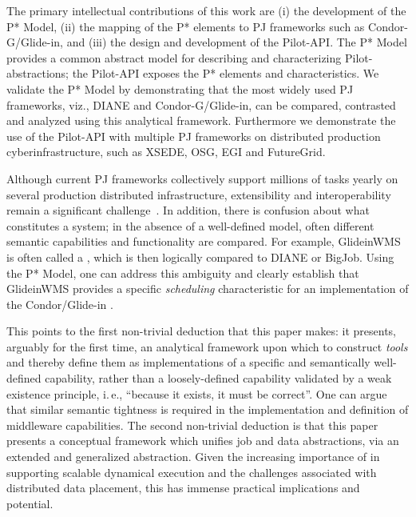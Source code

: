 \documentclass[conference]{IEEEtran}
\begin{document}

The primary intellectual contributions of this work are (i) the
development of the P* Model, (ii) the mapping of the P* elements to PJ
frameworks such as Condor-G/Glide-in, and (iii) the design and
development of the Pilot-API.  The P* Model provides a common abstract
model for describing and characterizing Pilot-abstractions; the
Pilot-API exposes the P* elements and characteristics.  We validate
the P* Model by demonstrating that the most widely used PJ frameworks,
viz., DIANE and Condor-G/Glide-in, can be compared, contrasted and
analyzed using this analytical framework.  Furthermore we demonstrate
the use of the Pilot-API with multiple PJ frameworks on distributed
production cyberinfrastructure, such as XSEDE, OSG, EGI and
FutureGrid.

Although current PJ frameworks collectively support millions of tasks
yearly on several production distributed infrastructure, extensibility
and interoperability remain a significant challenge~\cite{extenci}. In
addition, there is confusion about what constitutes a \pilotjob
system; in the absence of a well-defined model, often different
semantic capabilities and functionality are compared. For example, 
GlideinWMS is often called a \pilotjob, which is then logically
compared to DIANE or BigJob. Using the P* Model, one can address this
ambiguity and clearly establish that GlideinWMS provides a specific
{\it scheduling} characteristic for an implementation of the
Condor/Glide-in \pilotjob. 

This points to the first non-trivial deduction that this paper makes:
it presents, arguably for the first time, an analytical framework upon
which to construct {\it tools} and thereby define them as
implementations of a specific and semantically well-defined
capability, rather than a loosely-defined capability validated by a
weak existence principle, i.\,e., ``because it exists, it must be
correct''. One can argue that similar semantic tightness is required
in the implementation and definition of middleware capabilities.  The
second non-trivial deduction is that this paper presents a conceptual
framework which unifies job and data abstractions, via an extended and
generalized \pilot abstraction.  Given the increasing importance of
\pilotjobs in supporting scalable dynamical execution and the
challenges associated with distributed data placement, this
has immense practical implications and potential. 
\end{document}
